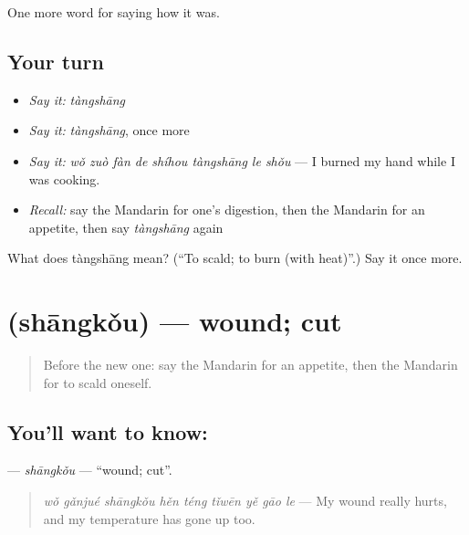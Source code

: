 \begin{grammarlens}[title={What you've built}]
One more word for saying how it was.
\end{grammarlens}

\subsection*{Your turn}
\begin{itemize}
\raggedright
  \item \emph{Say it:} \emph{tàngshāng}
  \item \emph{Say it:} \emph{tàngshāng}, once more
  \item \emph{Say it:} \emph{wǒ zuò fàn de shíhou tàngshāng le shǒu} — I burned my hand while I was cooking.
  \item \emph{Recall:} say the Mandarin for one's digestion, then the Mandarin for an appetite, then say \emph{tàngshāng} again
\end{itemize}

\begin{tcolorbox}[breakable,colback=teal!4,colframe=teal!35!black,title={Before you move on}]
What does tàngshāng mean? (\textquotedblleft{}To scald; to burn (with heat)\textquotedblright{}.) Say it once more.
\end{tcolorbox}
\section[\texorpdfstring{\zh{伤口} (shāngkǒu)}{伤口 (shāngkǒu)}]{ (shāngkǒu) — wound; cut}

\label{lesson:ZH-C478-shangkou}



\begin{quote}
Before the new one: say the Mandarin for an appetite, then the Mandarin for to scald oneself.
\end{quote}

\subsection*{You'll want to know: }
\textbf{} — \emph{shāngkǒu} — \textquotedblleft{}wound; cut\textquotedblright{}.

\begin{quote}
\textbf{} \emph{wǒ gǎnjué shāngkǒu hěn téng tǐwēn yě gāo le} — My wound really hurts, and my temperature has gone up too.
\end{quote}

